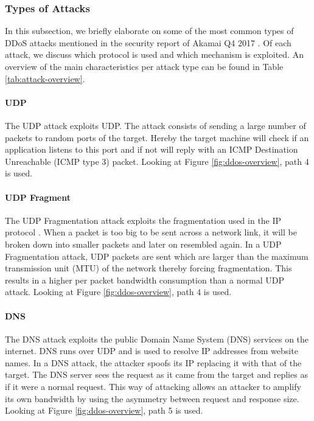 \subsubsection{Types of Attacks}\label{subsubsec:types-of-attacks}
In this subsection, we briefly elaborate on some of the most common types of DDoS attacks mentioned in the security report of Akamai Q4 2017 \cite{Akamai2017-4}. Of each attack, we discuss which protocol is used and which mechanism is exploited. An overview of the main characteristics per attack type can be found in Table \ref{tab:attack-overview}.


\paragraph{UDP}
The UDP attack exploits UDP. The attack consists of sending a large number of packets to random ports of the target. Hereby the target machine will check if an application listens to this port and if not will reply with an ICMP Destination Unreachable (ICMP type 3) packet. Looking at Figure \ref{fig:ddos-overview}, path 4 is used.

\paragraph{UDP Fragment}
The UDP Fragmentation attack exploits the fragmentation used in the IP protocol \cite{imperva}. When a packet is too big to be sent across a network link, it will be broken down into smaller packets and later on resembled again. In a UDP Fragmentation attack, UDP packets are sent which are larger than the maximum transmission unit (MTU) of the network thereby forcing fragmentation. This results in a higher per packet bandwidth consumption than a normal UDP attack. Looking at Figure \ref{fig:ddos-overview}, path 4 is used. 

\paragraph{DNS}
The DNS attack exploits the public Domain Name System (DNS) services on the internet. DNS runs over UDP and is used to resolve IP addresses from website names. In a DNS attack, the attacker spoofs its IP replacing it with that of the target. The DNS server sees the request as it came from the target and replies as if it were a normal request. This way of attacking allows an attacker to amplify its own bandwidth by using the asymmetry between request and response size. Looking at Figure \ref{fig:ddos-overview}, path 5 is used.

